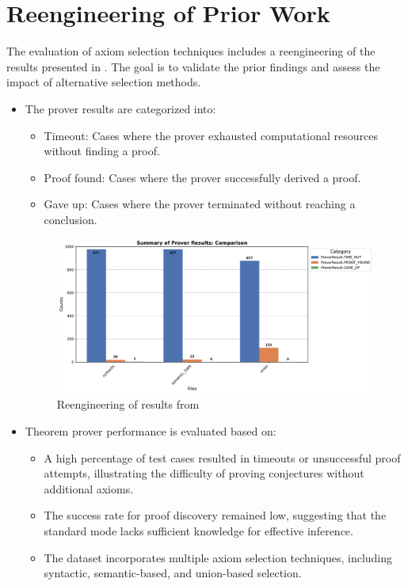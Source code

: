 \documentclass[english,version-2020-11]{uzl-thesis}
\begin{document}
\section{Reengineering of Prior Work \cite{Schon2024}}

The evaluation of axiom selection techniques includes a reengineering of the results presented in \cite{Schon2024}. The goal is to validate the prior findings and assess the impact of alternative selection methods.

\begin{itemize}
    \item The prover results are categorized into:
    \begin{itemize}
        \item Timeout: Cases where the prover exhausted computational resources without finding a proof.
        \item Proof found: Cases where the prover successfully derived a proof.
        \item Gave up: Cases where the prover terminated without reaching a conclusion.
    \end{itemize}

    \begin{figure}[h!]
        \centering
        \includegraphics[width=\textwidth]{standard_mode_noAdded_output.pdf}
        \caption{Reengineering of results from \cite{Schon2024}}
        \label{fig:reengineering}
    \end{figure}

    \FloatBarrier

    \item Theorem prover performance is evaluated based on:
    \begin{itemize}
        \item A high percentage of test cases resulted in timeouts or unsuccessful proof attempts, illustrating the difficulty of proving conjectures without additional axioms.
        \item The success rate for proof discovery remained low, suggesting that the standard mode lacks sufficient knowledge for effective inference.
        \item The dataset incorporates multiple axiom selection techniques, including syntactic, semantic-based, and union-based selection.
    \end{itemize}


\end{itemize}
\end{document}
